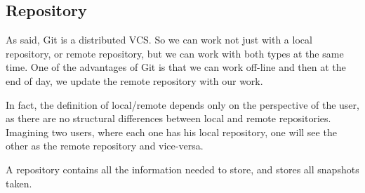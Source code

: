 \subsection{Repository}
As said, Git is a distributed VCS. So we can work not just with a local repository,
or remote repository, but we can work with both types at the same time. One of 
the advantages of Git is that we can work off-line and then at the end of day,
we update the remote repository with our work. \par
In fact, the definition of local/remote depends only on the perspective of the user,
as there are no structural differences between local and remote repositories. 
Imagining two users, where each one has his local repository, 
one will see the other as the remote repository and vice-versa. \par
A repository contains all the information needed to store, and stores all snapshots taken.
